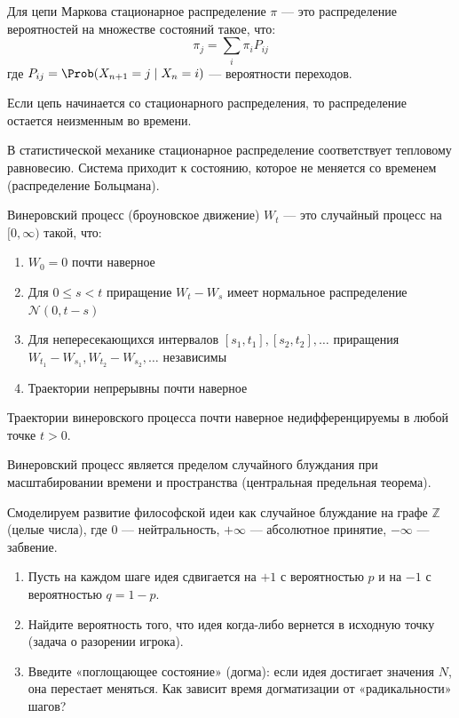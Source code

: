 \documentclass[11pt, a4paper]{extarticle}
\renewcommand{\le}{\leqslant}
\renewcommand{\P}{\Prob}
\begin{document}
\begin{definition}
Для цепи Маркова стационарное распределение $\pi$ --- это распределение вероятностей на множестве состояний такое, что:
$$\pi_j = \sum_i \pi_i P_{ij}$$
где $P_{ij} = \P(X_{n+1} = j \mid X_n = i)$ --- вероятности переходов.

Если цепь начинается со стационарного распределения, то распределение остается неизменным во времени.
\end{definition}

\begin{remark}
В статистической механике стационарное распределение соответствует тепловому равновесию. Система приходит к состоянию, которое не меняется со временем (распределение Больцмана).
\end{remark}

\begin{definition}
Винеровский процесс (броуновское движение) $W_t$ --- это случайный процесс на $[0, \infty)$ такой, что:
\begin{enumerate}
    \item $W_0 = 0$ почти наверное
    \item Для $0 \le s < t$ приращение $W_t - W_s$ имеет нормальное распределение $\mathcal{N}(0, t-s)$
    \item Для непересекающихся интервалов $[s_1, t_1], [s_2, t_2], \ldots$ приращения $W_{t_1} - W_{s_1}, W_{t_2} - W_{s_2}, \ldots$ независимы
    \item Траектории непрерывны почти наверное
\end{enumerate}
\end{definition}

\begin{theorem}
Траектории винеровского процесса почти наверное недифференцируемы в любой точке $t > 0$.
\end{theorem}

\begin{remark}
Винеровский процесс является пределом случайного блуждания при масштабировании времени и пространства (центральная предельная теорема).
\end{remark}

\begin{exercise}
Смоделируем развитие философской идеи как случайное блуждание на графе $\mathbb{Z}$ (целые числа), где $0$ — нейтральность, $+\infty$ — абсолютное принятие, $-\infty$ — забвение.
\begin{enumerate}
    \item Пусть на каждом шаге идея сдвигается на $+1$ с вероятностью $p$ и на $-1$ с вероятностью $q=1-p$.
    \item Найдите вероятность того, что идея когда-либо вернется в исходную точку (задача о разорении игрока).
    \item Введите «поглощающее состояние» (догма): если идея достигает значения $N$, она перестает меняться. Как зависит время догматизации от «радикальности» шагов?
\end{enumerate}
\end{exercise}
\end{document}
